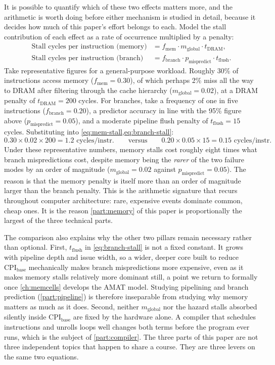 \documentclass[11pt,a4paper]{report}
\begin{document}
It is possible to quantify which of these two effects matters more, and
the arithmetic is worth doing before either mechanism is studied in
detail, because it decides how much of this paper's effort belongs to
each. Model the stall contribution of each effect as a rate of
occurrence multiplied by a penalty:
\begin{align}
\text{Stall cycles per instruction (memory)} &= f_{\text{mem}} \cdot m_{\text{global}} \cdot t_{\text{DRAM}}, \label{eq:mem-stall} \\
\text{Stall cycles per instruction (branch)} &= f_{\text{branch}} \cdot p_{\text{mispredict}} \cdot t_{\text{flush}}. \label{eq:branch-stall}
\end{align}
Take representative figures for a general-purpose workload. Roughly 30\%
of instructions access memory ($f_{\text{mem}} = 0.30$), of which
perhaps 2\% miss all the way to DRAM after filtering through the cache
hierarchy ($m_{\text{global}} = 0.02$), at a DRAM penalty of
$t_{\text{DRAM}} = 200$ cycles. For branches, take a frequency of one in
five instructions ($f_{\text{branch}} = 0.20$), a predictor accuracy in
line with the 95\% figure above ($p_{\text{mispredict}} = 0.05$), and a
moderate pipeline flush penalty of $t_{\text{flush}} = 15$ cycles.
Substituting into \cref{eq:mem-stall,eq:branch-stall}:
\[
0.30 \times 0.02 \times 200 = 1.2 \text{ cycles/instr.}
\qquad\text{versus}\qquad
0.20 \times 0.05 \times 15 = 0.15 \text{ cycles/instr.}
\]
Under these representative numbers, memory stalls cost roughly eight
times what branch mispredictions cost, despite memory being the
\emph{rarer} of the two failure modes by an order of magnitude
($m_{\text{global}} = 0.02$ against $p_{\text{mispredict}} = 0.05$). The
reason is that the memory penalty is itself more than an order of
magnitude larger than the branch penalty. This is the arithmetic
signature that recurs throughout computer architecture: rare, expensive
events dominate common, cheap ones. It is the reason \cref{part:memory}
of this paper is proportionally the largest of the three technical
parts.

The comparison also explains why the other two pillars remain necessary
rather than optional. First, $t_{\text{flush}}$ in \cref{eq:branch-stall}
is not a fixed constant. It grows with pipeline depth and issue width,
so a wider, deeper core built to reduce $\text{CPI}_{\text{base}}$
mechanically makes branch mispredictions more expensive, even as it
makes memory stalls relatively more dominant still, a point we return to
formally once \cref{ch:memcells} develops the AMAT model. Studying
pipelining and branch prediction (\cref{part:pipeline}) is therefore
inseparable from studying why memory matters as much as it does. Second,
neither $m_{\text{global}}$ nor the hazard stalls absorbed silently
inside $\text{CPI}_{\text{base}}$ are fixed by the hardware alone. A
compiler that schedules instructions and unrolls loops well changes both
terms before the program ever runs, which is the subject of
\cref{part:compiler}. The three parts of this paper are not three
independent topics that happen to share a course. They are three levers
on the same two equations.
\end{document}

